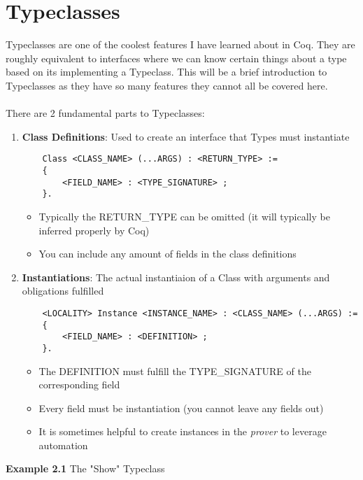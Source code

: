 \documentclass{article}
\begin{document}
    \section{Typeclasses}
    Typeclasses are one of the coolest features I have learned about in Coq. They are roughly equivalent to interfaces where we can know certain things about a type based on its implementing a Typeclass. 
    This will be a brief introduction to Typeclasses as they have so many features they cannot all be covered here.
    \\~\\
    There are 2 fundamental parts to Typeclasses:
    \begin{enumerate}
        \item \textbf{Class Definitions}: Used to create an interface that Types must instantiate
        \begin{verbatim}
    Class <CLASS_NAME> (...ARGS) : <RETURN_TYPE> := 
    {
        <FIELD_NAME> : <TYPE_SIGNATURE> ; 
    }.
        \end{verbatim} 
        
        \begin{itemize}
            \item Typically the RETURN\_TYPE can be omitted (it will typically be inferred properly by Coq)
            \item You can include any amount of fields in the class definitions
        \end{itemize} 

        \item \textbf{Instantiations}: The actual instantiaion of a Class with arguments and obligations fulfilled
        \begin{verbatim}
    <LOCALITY> Instance <INSTANCE_NAME> : <CLASS_NAME> (...ARGS) :=
    {
        <FIELD_NAME> : <DEFINITION> ;
    }.
        \end{verbatim}
        \begin{itemize}
            \item The DEFINITION must fulfill the TYPE\_SIGNATURE of the corresponding field
            \item Every field must be instantiation (you cannot leave any fields out)
            \item It is sometimes helpful to create instances in the \emph{prover} to leverage automation
        \end{itemize}
    \end{enumerate}
    \textbf{Example 2.1} The "Show" Typeclass \\
\end{document}
